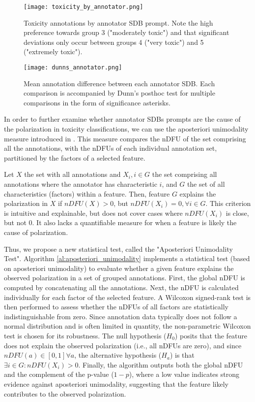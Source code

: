 \begin{figure}
	\centering
	\texttt{[image: toxicity\_by\_annotator.png]}
	\caption{Toxicity annotations by annotator \ac{SDB} prompt. Note the high preference towards group 3 ("moderately toxic") and that significant deviations only occur between groups 4 ("very toxic") and 5 ("extremely toxic").}
	\label{fig::toxicity-annotator}
\end{figure}

\begin{figure}
	\centering
	\texttt{[image: dunns\_annotator.png]}
	\caption{Mean annotation difference between each annotator \ac{SDB}. Each comparison is accompanied by Dunn's posthoc test for multiple comparisons in the form of significance asterisks.}
	\label{fig::toxicity-annotator-significance}
\end{figure}

In order to further examine whether annotator \acp{SDB} prompts are the cause of the polarization in toxicity classifications, we can use the aposteriori unimodality measure introduced in \citet{pavlopoulos-likas-2024-polarized}. This measure compares the \ac{nDFU} of the set comprising all the annotations, with the \acp{nDFU} of each individual annotation set, partitioned by the factors of a selected feature. 

Let $X$ the set with all annotations and $X_i, i \in G$ the set comprising all annotations where the annotator has characteristic $i$, and $G$ the set of all characteristics (factors) within a feature. Then, feature $G$ explains the polarization in $X$ if $nDFU(X) > 0$, but $nDFU(X_i) = 0, \forall i \in G$. This criterion is intuitive and explainable, but does not cover cases where $nDFU(X_i)$ is close, but not 0. It also lacks a quantifiable measure for when a feature is likely the cause of polarization. 

Thus, we propose a new statistical test, called the "Aposteriori Unimodality Test". Algorithm \ref{al:aposteriori_unimodality} implements a statistical test (based on aposteriori unimodality) to evaluate whether a given feature explains the observed polarization in a set of grouped annotations. First, the global \ac{nDFU} is computed by concatenating all the annotations. Next, the \ac{nDFU} is calculated individually for each factor of the selected feature. A Wilcoxon signed-rank test is then performed to assess whether the \acp{nDFU} of all factors are statistically indistinguishable from zero. Since annotation data typically does not follow a normal distribution and is often limited in quantity, the non-parametric Wilcoxon test is chosen for its robustness. The null hypothesis ($H_0$) posits that the feature does not explain the observed polarization (i.e., all \acp{nDFU} are zero), and since $nDFU(a) \in [0,1] \forall a$, the alternative hypothesis ($H_a$) is that $\exists i \in G: nDFU(X_i) > 0$. Finally, the algorithm outputs both the global \ac{nDFU} and the complement of the p-value ($1 - p$), where a low value indicates strong evidence against aposteriori unimodality, suggesting that the feature likely contributes to the observed polarization.

